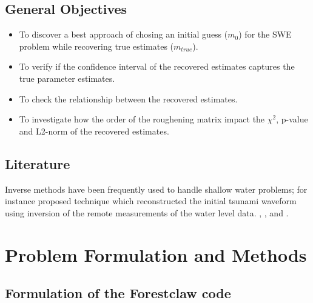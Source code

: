 \documentclass[12pt,a4paper]{article}
\begin{document}
	\subsection{General Objectives}
	
	\begin{itemize}
	\item To discover a best approach of chosing an initial guess ($m_0$) for the SWE problem while  recovering true estimates ($m_{true}$).
	\item  To verify if the confidence interval of the recovered estimates captures the true parameter estimates.
	\item To check the relationship between the recovered estimates.
	\item  To investigate how the order of the roughening matrix impact the $\chi^2$, p-value and L2-norm of the recovered estimates.
\end{itemize}


	\subsection{Literature}
		Inverse methods  have been frequently used to handle shallow water problems; for instance   \citet{cit} proposed technique which reconstructed the initial tsunami waveform using inversion of the remote measurements of the water level data. \citet{monnier2016inverse}, \citet{gessese2012direct}, and \citet{voronina2013inverse}.
	
	
	\section{ Problem Formulation and Methods}
 \subsection{Formulation of  the Forestclaw code}
 
\end{document}
